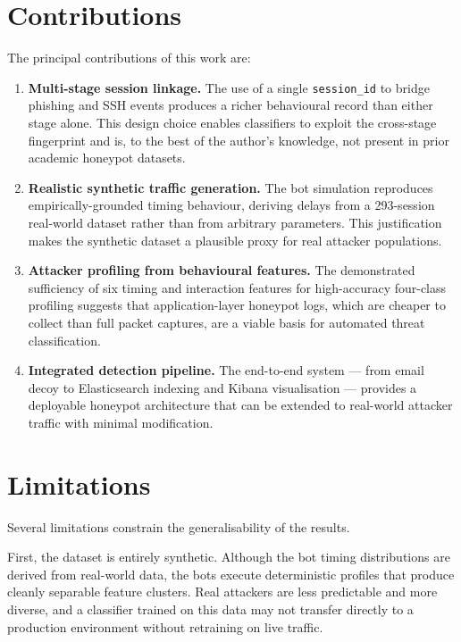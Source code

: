 \section{Contributions}

The principal contributions of this work are:

\begin{enumerate}
    \item \textbf{Multi-stage session linkage.} The use of a single
    \texttt{session\_id} to bridge phishing and SSH events produces a
    richer behavioural record than either stage alone. This design
    choice enables classifiers to exploit the cross-stage fingerprint
    and is, to the best of the author's knowledge, not present in
    prior academic honeypot datasets.

    \item \textbf{Realistic synthetic traffic generation.} The bot
    simulation reproduces empirically-grounded timing behaviour, deriving
    delays from a 293-session real-world dataset rather than from
    arbitrary parameters. This justification makes the synthetic dataset
    a plausible proxy for real attacker populations.

    \item \textbf{Attacker profiling from behavioural features.} The
    demonstrated sufficiency of six timing and interaction features for
    high-accuracy four-class profiling suggests that application-layer
    honeypot logs, which are cheaper to collect than full packet captures,
    are a viable basis for automated threat classification.

    \item \textbf{Integrated detection pipeline.} The end-to-end system
    — from email decoy to Elasticsearch indexing and Kibana
    visualisation — provides a deployable honeypot architecture that
    can be extended to real-world attacker traffic with minimal
    modification.
\end{enumerate}

\section{Limitations}

Several limitations constrain the generalisability of the results.

First, the dataset is entirely synthetic. Although the bot timing
distributions are derived from real-world data, the bots execute
deterministic profiles that produce cleanly separable feature clusters.
Real attackers are less predictable and more diverse, and a classifier
trained on this data may not transfer directly to a production
environment without retraining on live traffic.

